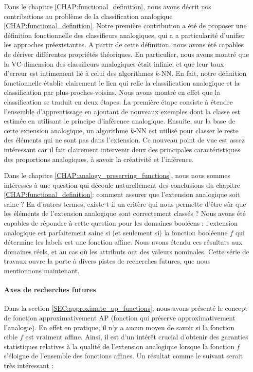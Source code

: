 Dans le chapitre \ref{CHAP:functional_definition}, nous avons décrit nos
contributions au problème de la classification analogique
\ref{CHAP:functional_definition}. Notre première contribution a été de proposer
une définition fonctionnelle des classifieurs analogiques, qui a a
particularité d'unifier les approches préexistantes. A partir de cette
définition, nous avons été capables de dériver différentes propriétés
théoriques. En particulier, nous avons montré que la VC-dimension des
classifieurs analogiques était infinie, et que leur taux d'erreur est
intimement lié à celui des algorithmes $k$-NN. En fait, notre définition
fonctionnelle établie clairement le lien qui relie la classification analogique
et la classification par plus-proches-voisins. Nous avons montré en effet que
la classification se traduit en deux étapes. La première étape consiste à
étendre l'ensemble d'apprentissage en ajoutant de nouveaux exemples dont la
classe est estimée en utilisant le principe d'inférence analogique. Ensuite,
sur la base de cette extension analogique, un algorithme $k$-NN est utilisé
pour classer le reste des éléments qui ne sont pas dans l'extension. Ce nouveau
point de vue est assez intéressant car il fait clairement intervenir deux des
principales caractéristiques des proportions analogiques, à savoir la
créativité et l'inférence.

Dans le chapitre \ref{CHAP:analogy_preserving_functions}, nous nous sommes
intéressés à une question qui découle naturellement des conclusions du chapitre
\ref{CHAP:functional_definition}: comment assurer que l'extension analogique
soit saine ? En d'autres termes, existe-t-il un critère qui nous permette
d'être sûr que les éléments de l'extension analogique sont correctement
classés ? Nous avons été capables de répondre à cette question  pour les
domaines booléens : l'extension analogique est parfaitement saine si (et
seulement si) la fonction booléenne $f$ qui détermine les labels est une
fonction affine. Nous avons étendu ces résultats aux domaines réels, et au cas
où les attributs ont des valeurs nominales. Cette série de travaux ouvre la
porte à divers pistes de recherches futures, que nous mentionnons maintenant.

\paragraph{Axes de recherches futures\\}

Dans la section \ref{SEC:approximate_ap_functions}, nous avons présenté le
concept de fonction approximativement AP (fonction qui préserve
approximativement l'analogie). En effet en pratique, il n'y a aucun moyen de
savoir si la fonction cible $f$ est vraiment affine. Ainsi, il est d'un intérêt
crucial d'obtenir des garanties statistiques relatives à la qualité de
l'extension analogique lorsque la fonction $f$ s'éloigne de l'ensemble des
fonctions affines. Un résultat comme le suivant serait très intéressant :

